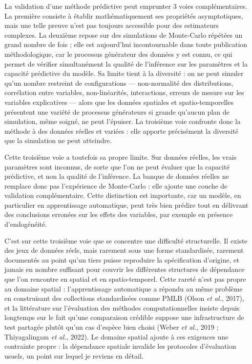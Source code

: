 \documentclass[11pt,a4paper]{article}
\begin{document}
La validation d'une méthode prédictive peut emprunter 3 voies complémentaires. La première consiste à établir mathématiquement ses propriétés asymptotiques, mais une telle preuve n'est pas toujours accessible pour des estimateurs complexes. La deuxième repose sur des simulations de Monte-Carlo répétées un grand nombre de fois ; elle est aujourd'hui incontournable dans toute publication méthodologique, car le processus générateur des données y est connu, ce qui permet de vérifier simultanément la qualité de l'inférence sur les paramètres et la capacité prédictive du modèle. Sa limite tient à la diversité : on ne peut simuler qu'un nombre restreint de configurations --- non-normalité des distributions, corrélation entre variables, non-linéarités, interactions, erreurs de mesure sur les variables explicatives --- alors que les données spatiales et spatio-temporelles présentent une variété de processus générateurs si grande qu'aucun plan de simulation, même soigné, ne peut l'épuiser. La troisième voie confronte donc la méthode à des données réelles et variées : elle apporte précisément la diversité que la simulation ne peut atteindre.

Cette troisième voie a toutefois sa propre limite. Sur données réelles, les vrais paramètres sont inconnus, de sorte que l'on ne peut évaluer que la capacité prédictive, et non la qualité de l'inférence. La banque de données réelles ne remplace donc pas l'expérience de Monte-Carlo : elle ajoute une couche de validation complémentaire. Cette distinction est importante, car un modèle, en particulier en apprentissage automatique, peut très bien prédire tout en délivrant des conclusions erronées sur les effets des variables, par exemple en présence d'endogénéité.

C'est sur cette troisième voie que se concentre une difficulté structurelle. Il existe des jeux de données réels, mais rarement sous une forme standardisée, rarement documentés au point qu'un tiers puisse reproduire la spécification d'origine, et jamais en nombre suffisant pour couvrir les différentes structures de dépendance que l'on rencontre en spatial et en spatio-temporel. Cette rareté n'est pas propre au domaine spatial : l'apprentissage automatique a répondu au même problème en construisant des collections standardisées comme PMLB (Olson \textit{et al.}, 2017), et la littérature sur l'évaluation des méthodes computationnelles insiste depuis longtemps sur le fait qu'une comparaison crédible suppose une infrastructure de test partagée plutôt qu'un cas d'espèce bien choisi (Weber \textit{et al.}, 2019 ; Thiyagalingam \textit{et al.}, 2022). Le domaine spatial ajoute à ces exigences une contrainte propre : la dépendance spatiale invalide les protocoles d'évaluation usuels, un point sur lequel je reviens en détail.
\end{document}
